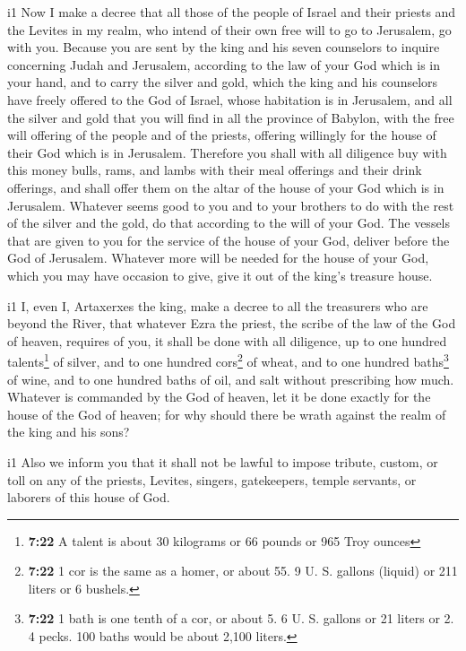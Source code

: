i1 Now  I make a decree that all those of the people of
Israel and their priests and the Levites in my realm, who intend of
their own free will to go to Jerusalem, go with you. 
Because you are sent by the king and his seven counselors to inquire
concerning Judah and Jerusalem, according to the law of your God which
is in your hand,  and to carry the silver and gold, which
the king and his counselors have freely offered to the God of Israel,
whose habitation is in Jerusalem,  and all the silver and
gold that you will find in all the province of Babylon, with the free
will offering of the people and of the priests, offering willingly for
the house of their God which is in Jerusalem.  Therefore
you shall with all diligence buy with this money bulls, rams, and lambs
with their meal offerings and their drink offerings, and shall offer
them on the altar of the house of your God which is in Jerusalem.
 Whatever seems good to you and to your brothers to do
with the rest of the silver and the gold, do that according to the will
of your God.  The vessels that are given to you for the
service of the house of your God, deliver before the God of Jerusalem.
 Whatever more will be needed for the house of your God,
which you may have occasion to give, give it out of the king's treasure
house.

i1 I, even I, Artaxerxes the king, make a decree to all
the treasurers who are beyond the River, that whatever Ezra the priest,
the scribe of the law of the God of heaven, requires of you, it shall be
done with all diligence,  up to one hundred
talents\footnote{\textbf{7:22} A talent is about 30 kilograms or 66
  pounds or 965 Troy ounces} of silver, and to one hundred
cors\footnote{\textbf{7:22} 1 cor is the same as a homer, or about 55. 9
  U. S. gallons (liquid) or 211 liters or 6 bushels.} of wheat, and to
one hundred baths\footnote{\textbf{7:22} 1 bath is one tenth of a cor,
  or about 5. 6 U. S. gallons or 21 liters or 2. 4 pecks. 100 baths
  would be about 2,100 liters.} of wine, and to one hundred baths of
oil, and salt without prescribing how much.  Whatever is
commanded by the God of heaven, let it be done exactly for the house of
the God of heaven; for why should there be wrath against the realm of
the king and his sons?

i1 Also we inform you that it shall not be lawful to
impose tribute, custom, or toll on any of the priests, Levites, singers,
gatekeepers, temple servants, or laborers of this house of God.

